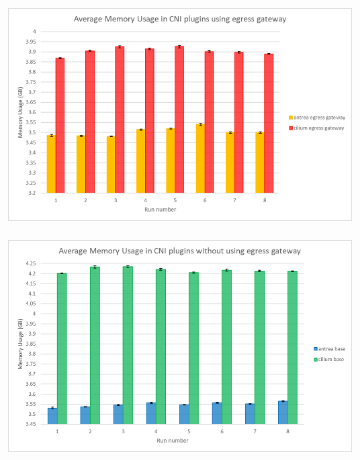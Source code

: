 \begin{figure}[H]
    \centering
    \begin{subfigure}[b]{0.35\textwidth}
        \includegraphics[width=\textwidth]{plots/small/memory_egress.png}
        \caption{}
        \label{fig:memory_a}
    \end{subfigure}
    \hfill
    \begin{subfigure}[b]{0.35\textwidth}
        \includegraphics[width=\textwidth]{plots/small/memory_base.png}
        \caption{}
        \label{fig:memory_b}
    \end{subfigure}
    
    \vspace{10pt}
    

\end{figure}
